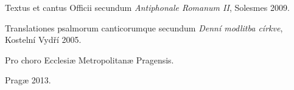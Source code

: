 \documentclass[a5paper, twoside, 12pt]{article}
\begin{document}


\sci


\vfill


\pagebreak

\pagestyle{empty}

\mbox{}
\vfill

Textus et cantus Officii secundum
\emph{Antiphonale Romanum II}, Solesmes 2009.

Translationes psalmorum canticorumque secundum 
\emph{Denní modlitba církve}, Kostelní Vydří 2005.

\begin{center}
Pro choro Ecclesiæ Metropolitanæ Pragensis.

Pragæ 2013.
\end{center}
\end{document}
